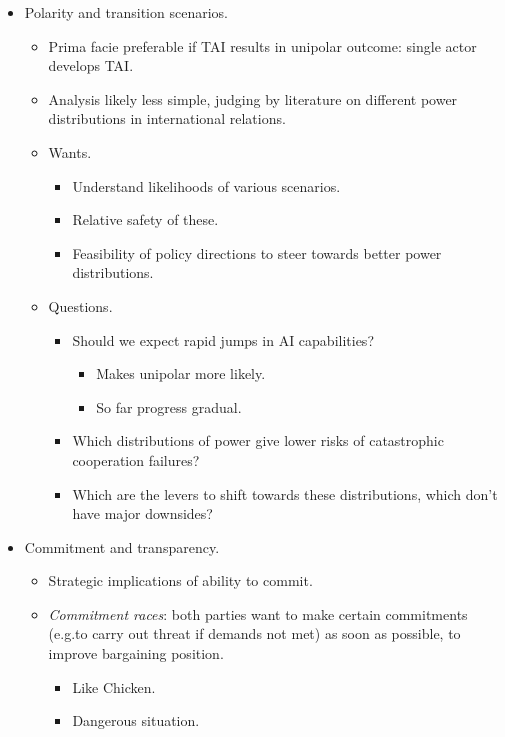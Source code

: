 \begin{itemize}
    \item Polarity and transition scenarios.
    \begin{itemize}
        \item Prima facie preferable if TAI results in unipolar outcome: single actor develops TAI.
        \item Analysis likely less simple, judging by literature on different power distributions in international relations.
        \item Wants.
        \begin{itemize}
            \item Understand likelihoods of various scenarios.
            \item Relative safety of these.
            \item Feasibility of policy directions to steer towards better power distributions.
        \end{itemize}
        \item Questions.
        \begin{itemize}
            \item Should we expect rapid jumps in AI capabilities?
            \begin{itemize}
                \item Makes unipolar more likely.
                \item So far progress gradual.
            \end{itemize}
            \item Which distributions of power give lower risks of catastrophic cooperation failures?
            \item Which are the levers to shift towards these distributions, which don't have major downsides?
        \end{itemize}
    \end{itemize}
    \item Commitment and transparency.
    \begin{itemize}
        \item Strategic implications of ability to commit.
        \item \emph{Commitment races}: both parties want to make certain commitments (e.g.\@ to carry out threat if demands not met) as soon as possible, to improve bargaining position.
        \begin{itemize}
            \item Like Chicken.
            \item Dangerous situation.

\end{itemize}
\end{itemize}
\end{itemize}

